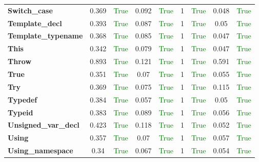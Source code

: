 \documentclass{article}
\begin{document}
\begin{xltabular}{\textwidth}{lcccccccc}
\textbf{{\fontsize{10}{12}\selectfont Switch\_case}}& 0.369&\textcolor{green}{True}& 0.092&\textcolor{green}{True}& 1&\textcolor{green}{True}& 0.048&\textcolor{green}{True} \\[0.5ex]
\textbf{{\fontsize{10}{12}\selectfont Template\_decl}}& 0.393&\textcolor{green}{True}& 0.087&\textcolor{green}{True}& 1&\textcolor{green}{True}& 0.05&\textcolor{green}{True} \\[0.5ex]
\textbf{{\fontsize{10}{12}\selectfont Template\_typename}}& 0.368&\textcolor{green}{True}& 0.085&\textcolor{green}{True}& 1&\textcolor{green}{True}& 0.047&\textcolor{green}{True} \\[0.5ex]
\textbf{{\fontsize{10}{12}\selectfont This}}& 0.342&\textcolor{green}{True}& 0.079&\textcolor{green}{True}& 1&\textcolor{green}{True}& 0.047&\textcolor{green}{True} \\[0.5ex]
\textbf{{\fontsize{10}{12}\selectfont Throw}}& 0.893&\textcolor{green}{True}& 0.121&\textcolor{green}{True}& 1&\textcolor{green}{True}& 0.591&\textcolor{green}{True} \\[0.5ex]
\textbf{{\fontsize{10}{12}\selectfont True}}& 0.351&\textcolor{green}{True}& 0.07&\textcolor{green}{True}& 1&\textcolor{green}{True}& 0.055&\textcolor{green}{True} \\[0.5ex]
\textbf{{\fontsize{10}{12}\selectfont Try}}& 0.369&\textcolor{green}{True}& 0.075&\textcolor{green}{True}& 1&\textcolor{green}{True}& 0.115&\textcolor{green}{True} \\[0.5ex]
\textbf{{\fontsize{10}{12}\selectfont Typedef}}& 0.384&\textcolor{green}{True}& 0.057&\textcolor{green}{True}& 1&\textcolor{green}{True}& 0.05&\textcolor{green}{True} \\[0.5ex]
\textbf{{\fontsize{10}{12}\selectfont Typeid}}& 0.383&\textcolor{green}{True}& 0.089&\textcolor{green}{True}& 1&\textcolor{green}{True}& 0.056&\textcolor{green}{True} \\[0.5ex]
\textbf{{\fontsize{10}{12}\selectfont Unsigned\_var\_decl}}& 0.423&\textcolor{green}{True}& 0.118&\textcolor{green}{True}& 1&\textcolor{green}{True}& 0.052&\textcolor{green}{True} \\[0.5ex]
\textbf{{\fontsize{10}{12}\selectfont Using}}& 0.357&\textcolor{green}{True}& 0.07&\textcolor{green}{True}& 1&\textcolor{green}{True}& 0.057&\textcolor{green}{True} \\[0.5ex]
\textbf{{\fontsize{10}{12}\selectfont Using\_namespace}}& 0.34&\textcolor{green}{True}& 0.067&\textcolor{green}{True}& 1&\textcolor{green}{True}& 0.054&\textcolor{green}{True} \\[0.5ex]

\end{xltabular}
\end{document}
